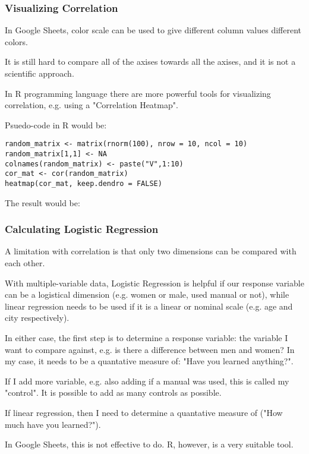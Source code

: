\subsubsection{Visualizing Correlation}

In Google Sheets, color scale can be used to give different column values different colors.

It is still hard to compare all of the axises towards all the axises, and it is not a scientific approach.


In R programming language there are more powerful tools for visualizing correlation, e.g. using a "Correlation Heatmap".

Psuedo-code in R would be:

\begin{verbatim}
random_matrix <- matrix(rnorm(100), nrow = 10, ncol = 10)
random_matrix[1,1] <- NA
colnames(random_matrix) <- paste("V",1:10)
cor_mat <- cor(random_matrix)
heatmap(cor_mat, keep.dendro = FALSE)
\end{verbatim}

The result would be:


\subsubsection{Calculating Logistic Regression}

A limitation with correlation is that only two dimensions can be compared with each other.

With multiple-variable data, Logistic Regression is helpful if our response variable can be a logistical dimension (e.g. women or male, used manual or not), while linear regression needs to be used if it is a linear or nominal scale (e.g. age and city respectively).

In either case, the first step is to determine a response variable: the variable I want to compare against, e.g. is there a difference between men and women? In my case, it needs to be a quantative measure of: "Have you learned anything?".

If I add more variable, e.g. also adding if a manual was used, this is called my "control". It is possible to add as many controls as possible.

If linear regression, then I need to determine a quantative measure of ("How much have you learned?").

In Google Sheets, this is not effective to do. R, however, is a very suitable tool.

